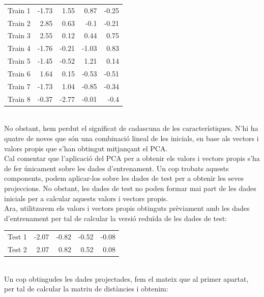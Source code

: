 \documentclass{article} %
\begin{document}
{	{\selectfont\small
	\begin{tabular}{r | r r r r}
		Train 1 & -1.73 & 1.55 & 0.87 & -0.25 \\
		Train 2 & 2.85 & 0.63 & -0.1 & -0.21 \\
		Train 3 & 2.55 & 0.12 & 0.44 & 0.75 \\
		Train 4 & -1.76 & -0.21 & -1.03 & 0.83 \\
		Train 5 & -1.45 & -0.52 & 1.21 & 0.14 \\
		Train 6 & 1.64 & 0.15 & -0.53 & -0.51 \\
		Train 7 & -1.73 & 1.04 & -0.85 & -0.34 \\
		Train 8 & -0.37 & -2.77 & -0.01 & -0.4 \\
	\end{tabular}
	} \\

	No obstant, hem perdut el significat de cadascuna de les característiques. N’hi ha quatre de noves que són una combinació lineal de les inicials, en base als vectors i valors propis que s’han obtingut mitjançant el PCA. \\

	Cal comentar que l'aplicació del PCA per a obtenir els valors i vectors propis s'ha de fer únicament sobre les dades d'entrenament. Un cop trobats aquests components, podem aplicar-los sobre les dades de test per a obtenir les seves projeccions. No obstant, les dades de test no poden formar mai part de les dades inicials per a calcular aquests valors i vectors propis. \\

	Ara, utilitzarem els valors i vectors propis obtinguts prèviament amb les dades d'entrenament per tal de calcular la versió reduïda de les dades de test: \\

	{\selectfont\small
	\begin{tabular}{r | r r r r}
		Test 1 & -2.07 & -0.82 & -0.52 & -0.08 \\
		Test 2 & 2.07 & 0.82 & 0.52 & 0.08 \\
	\end{tabular}
	} \\

	Un cop obtingudes les dades projectades, fem el mateix que al primer apartat, per tal de calcular la matriu de distàncies i obtenim: \\

}
\end{document}
